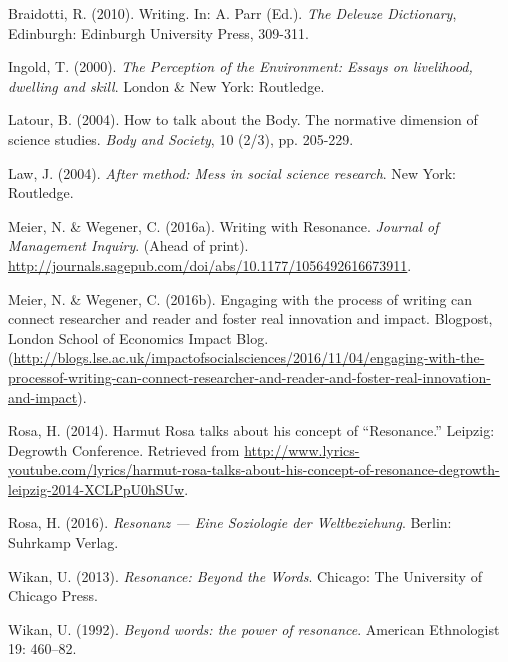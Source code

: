 \label{paper1:references}
\begin{thebibliography}{99}

\item Braidotti, R. (2010). Writing. In: A. Parr (Ed.). \textit{The Deleuze Dictionary}, Edinburgh: Edinburgh University Press, 309-311.   
\item Ingold, T. (2000). \textit{The Perception of the Environment: Essays on livelihood, dwelling and skill}. London \& New York: Routledge. 
\item Latour, B. (2004). How to talk about the Body. The normative dimension of science studies. \textit{Body and Society}, 10 (2/3), pp. 205-229.  
\item Law, J. (2004). \textit{After method: Mess in social science research}. New York: Routledge. 
\item Meier, N. \& Wegener, C. (2016a). Writing with Resonance. \textit{Journal of Management Inquiry}. (Ahead of print). \url{http://journals.sagepub.com/doi/abs/10.1177/1056492616673911}.
\item Meier, N. \& Wegener, C. (2016b). Engaging with the process of writing can connect researcher and reader and foster real innovation and impact. Blogpost, London School of Economics Impact Blog. (\url{http://blogs.lse.ac.uk/impactofsocialsciences/2016/11/04/engaging-with-the-processof-writing-can-connect-researcher-and-reader-and-foster-real-innovation-and-impact}).
\item Rosa, H. (2014). Harmut Rosa talks about his concept of “Resonance.” Leipzig: Degrowth Conference. Retrieved from \url{http://www.lyrics-youtube.com/lyrics/harmut-rosa-talks-about-his-concept-of-resonance-degrowth-leipzig-2014-XCLPpU0hSUw}.
\item Rosa, H. (2016). \textit{Resonanz --- Eine Soziologie der Weltbeziehung}. Berlin: Suhrkamp Verlag. 
\item Wikan, U. (2013). \textit{Resonance: Beyond the Words}. Chicago: The University of Chicago Press. 
\item Wikan, U. (1992). \textit{Beyond words: the power of resonance}. American Ethnologist 19: 460–82.

\end{thebibliography}